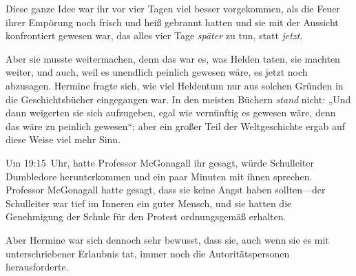 Diese ganze Idee war ihr vor vier Tagen viel besser vorgekommen, als die Feuer ihrer Empörung noch frisch und heiß gebrannt hatten und sie mit der Aussicht konfrontiert gewesen war, das alles vier Tage \emph{später} zu tun, statt \emph{jetzt}.

Aber sie musste weitermachen, denn das war es, was Helden taten, sie machten weiter, und auch, weil es unendlich peinlich gewesen wäre, es jetzt noch abzusagen. Hermine fragte sich, wie viel Heldentum nur aus solchen Gründen in die Geschichtsbücher eingegangen war. In den meisten Büchern \emph{stand} nicht:
„Und dann weigerten sie sich aufzugeben, egal wie vernünftig es gewesen wäre, denn das wäre zu peinlich gewesen“; aber ein großer Teil der Weltgeschichte ergab auf diese Weise viel mehr Sinn.

Um 19:15~Uhr, hatte Professor McGonagall ihr gesagt, würde Schulleiter Dumbledore herunterkommen und ein paar Minuten mit ihnen sprechen. Professor McGonagall hatte gesagt, dass sie keine Angst haben sollten—der Schulleiter war tief im Inneren ein guter Mensch, und sie hatten die Genehmigung der Schule für den Protest ordnungsgemäß erhalten.

Aber Hermine war sich dennoch sehr bewusst, dass sie, auch wenn sie es mit unterschriebener Erlaubnis tat, immer noch die Autoritätspersonen herausforderte.

